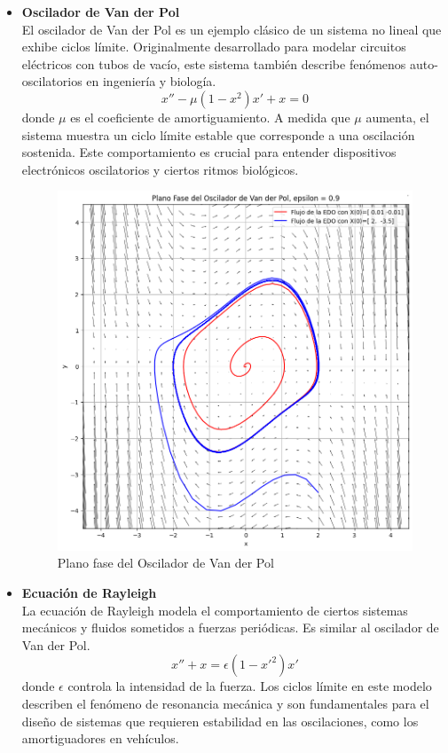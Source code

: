 \documentclass[12pt, a4paper]{report}
\begin{document}
\newpage

\begin{itemize}
	\item \textbf{Oscilador de Van der Pol}\\
	
	El oscilador de Van der Pol es un ejemplo clásico de un sistema no lineal que exhibe ciclos límite. Originalmente desarrollado para modelar circuitos eléctricos con tubos de vacío, este sistema también describe fenómenos auto-oscilatorios en ingeniería y biología.
	\begin{equation}
		x''-\mu \left(1-x^2\right)x'+x=0
	\end{equation}
	donde $\mu$ es el coeficiente de amortiguamiento.  A medida que $\mu$ aumenta, el sistema muestra un ciclo límite estable que corresponde a una oscilación sostenida. Este comportamiento es crucial para entender dispositivos electrónicos oscilatorios y ciertos ritmos biológicos.

	\begin{figure}[h]
		\centering
		\includegraphics[width=11cm]{introVanderPol.png}
		\caption{Plano fase del Oscilador de Van der Pol}
	\end{figure}

	\newpage

	\item \textbf{Ecuación de Rayleigh}\\
	
	La ecuación de Rayleigh modela el comportamiento de ciertos sistemas mecánicos y fluidos sometidos a fuerzas periódicas. Es similar al oscilador de Van der Pol.
	\begin{equation}
		x''+x=\epsilon\left(1-x'^2\right)x'
	\end{equation}
	donde $\epsilon$ controla la intensidad de la fuerza. Los ciclos límite en este modelo describen el fenómeno de resonancia mecánica y son fundamentales para el diseño de sistemas que requieren estabilidad en las oscilaciones, como los amortiguadores en vehículos.


\end{itemize}
\end{document}
